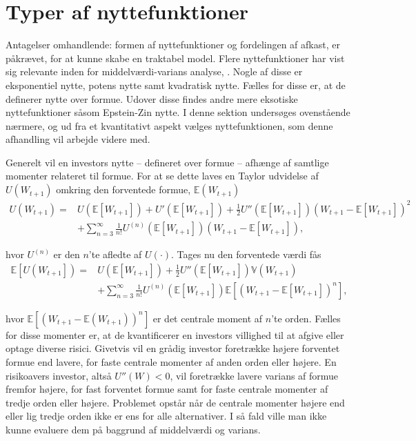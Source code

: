 \documentclass[
  a4paper,
  oneside]{memoir}
\begin{document}
\hypertarget{typnyt}{%
\section{Typer af nyttefunktioner}\label{typnyt}}

Antagelser omhandlende: formen af nyttefunktioner og fordelingen af afkast, er påkrævet, for at kunne skabe en traktabel model. Flere nyttefunktioner har vist sig relevante inden for middelværdi-varians analyse, \citep{CampVic2003}. Nogle af disse er eksponentiel nytte, potens nytte samt kvadratisk nytte. Fælles for disse er, at de definerer nytte over formue. Udover disse findes andre mere eksotiske nyttefunktioner såsom Epstein-Zin nytte. I denne sektion undersøges ovenstående nærmere, og ud fra et kvantitativt aspekt vælges nyttefunktionen, som denne afhandling vil arbejde videre med.

Generelt vil en investors nytte -- defineret over formue -- afhænge af samtlige momenter relateret til formue. For at se dette laves en Taylor udvidelse af \(U(W_{t+1})\) omkring den forventede formue, \(\mathbb{E}(W_{t+1})\)
\begin{align*}
U\left(W_{t+1}\right)=&U\left(\mathbb{E}\left[W_{t+1}\right]\right)+U'\left(\mathbb{E}\left[W_{t+1}\right]\right)+\frac{1}{2}U''\left(\mathbb{E}\left[W_{t+1}\right]\right)\left(W_{t+1}-\mathbb{E}\left[W_{t+1}\right]\right)^2\\
&+\sum_{n=3}^\infty \frac{1}{n!}U^{\left(n\right)}\left(\mathbb{E}\left[W_{t+1}\right]\right)\left(W_{t+1}-\mathbb{E}\left[W_{t+1}\right]\right),
\end{align*}

hvor \(U^{(n)}\) er den \(n\)'te afledte af \(U(\cdot)\). Tages nu den forventede værdi fås
\begin{align*}
\mathbb{E}\left[U\left(W_{t+1}\right]\right)=&U\left(\mathbb{E}\left[W_{t+1}\right]\right)+\frac{1}{2}U''\left(\mathbb{E}\left[W_{t+1}\right]\right)\mathbb{V}\left(W_{t+1}\right)\\
&+\sum_{n=3}^\infty \frac{1}{n!} U^{\left(n\right)}\left(\mathbb{E}\left[W_{t+1}\right]\right)\mathbb{E}\left[\left(W_{t+1}-\mathbb{E}\left[W_{t+1}\right]\right)^n\right],
\end{align*}

hvor \(\mathbb{E}\left[(W_{t+1}-\mathbb{E}(W_{t+1}))^n\right]\) er det centrale moment af \(n\)'te orden. Fælles for disse momenter er, at de kvantificerer en investors villighed til at afgive eller optage diverse risici. Givetvis vil en grådig investor foretrække højere forventet formue end lavere, for faste centrale momenter af anden orden eller højere. En risikoavers investor, altså \(U''(W)<0\), vil foretrække lavere varians af formue fremfor højere, for fast forventet formue samt for faste centrale momenter af tredje orden eller højere. Problemet opstår når de centrale momenter højere end eller lig tredje orden ikke er ens for alle alternativer. I så fald ville man ikke kunne evaluere dem på baggrund af middelværdi og varians.
\end{document}
